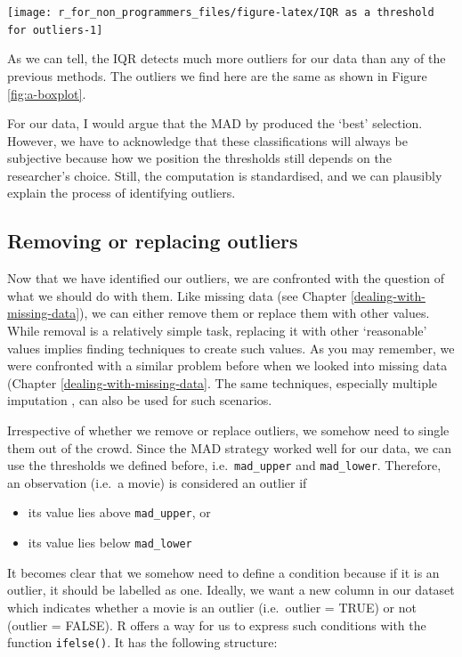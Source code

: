 \documentclass[
]{book}
\begin{document}
\begin{center}\texttt{[image: r\_for\_non\_programmers\_files/figure-latex/IQR as a threshold for outliers-1]} \end{center}

As we can tell, the IQR detects much more outliers for our data than any of the previous methods. The outliers we find here are the same as shown in Figure \ref{fig:a-boxplot}.

For our data, I would argue that the MAD by \citet{leys2013detecting} produced the `best' selection. However, we have to acknowledge that these classifications will always be subjective because how we position the thresholds still depends on the researcher's choice. Still, the computation is standardised, and we can plausibly explain the process of identifying outliers.

\hypertarget{removing-or-replacing-outliers}{%
\subsection{Removing or replacing outliers}\label{removing-or-replacing-outliers}}

Now that we have identified our outliers, we are confronted with the question of what we should do with them. Like missing data (see Chapter \ref{dealing-with-missing-data}), we can either remove them or replace them with other values. While removal is a relatively simple task, replacing it with other `reasonable' values implies finding techniques to create such values. As you may remember, we were confronted with a similar problem before when we looked into missing data (Chapter \ref{dealing-with-missing-data}. The same techniques, especially multiple imputation \citep[see][]{cousineau2010outliers}, can also be used for such scenarios.

Irrespective of whether we remove or replace outliers, we somehow need to single them out of the crowd. Since the MAD strategy worked well for our data, we can use the thresholds we defined before, i.e.~\texttt{mad\_upper} and \texttt{mad\_lower}. Therefore, an observation (i.e.~a movie) is considered an outlier if

\begin{itemize}
\item
  its value lies above \texttt{mad\_upper}, or
\item
  its value lies below \texttt{mad\_lower}
\end{itemize}

It becomes clear that we somehow need to define a condition because if it is an outlier, it should be labelled as one. Ideally, we want a new column in our dataset which indicates whether a movie is an outlier (i.e.~outlier = TRUE) or not (outlier = FALSE). R offers a way for us to express such conditions with the function \texttt{ifelse()}. It has the following structure:
\end{document}
